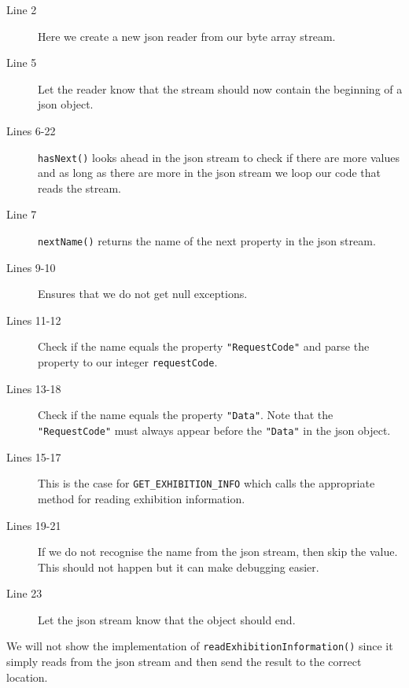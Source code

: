 \begin{description}
\item[Line 2] Here we create a new \ac{json} reader from our byte array stream.
\item[Line 5] Let the reader know that the stream should now contain the beginning of a \ac{json} object.
\item[Lines 6-22] \lstinline|hasNext()| looks ahead in the \ac{json} stream to check if there are more values and as long as there are more in the \ac{json} stream we loop our code that reads the stream.
\item[Line 7] \lstinline|nextName()| returns the name of the next property in the \ac{json} stream.
\item[Lines 9-10] Ensures that we do not get null exceptions.
\item[Lines 11-12] Check if the name equals the property \lstinline|"RequestCode"| and parse the property to our integer \lstinline|requestCode|.
\item[Lines 13-18] Check if the name equals the property \lstinline|"Data"|. Note that the \lstinline|"RequestCode"| must always appear before the \lstinline|"Data"| in the \ac{json} object.
\item[Lines 15-17] This is the case for \lstinline|GET_EXHIBITION_INFO| which calls the appropriate method for reading exhibition information.
\item[Lines 19-21] If we do not recognise the name from the \ac{json} stream, then skip the value. This should not happen but it can make debugging easier.
\item[Line 23] Let the \ac{json} stream know that the object should end.
\end{description}
We will not show the implementation of \lstinline|readExhibitionInformation()| since it simply reads from the \ac{json} stream and then send the result to the correct location.
